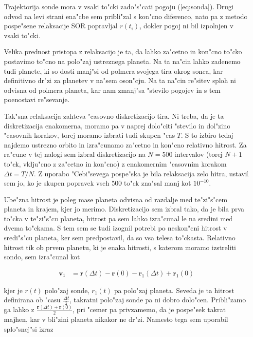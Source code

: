 \documentclass[a4paper,10pt]{article}
\renewcommand{\vec}{\mathbf}
\begin{document}
Trajektorija sonde mora v vsaki to"cki zado"s"cati pogoju (\ref{eq:sonda}). Drugi odvod na levi strani ena"cbe sem pribli"zal s kon"cno diferenco, nato pa z metodo pospe"sene relaksacije SOR popravljal $r(t_i)$, dokler pogoj ni bil izpolnjen v vsaki to"cki.

Velika prednost pristopa z relaksacijo je ta, da lahko za"cetno in kon"cno to"cko postavimo to"cno na polo"zaj ustreznega planeta. Na ta na"cin lahko zadenemo tudi planete, ki so dosti manj"si od polmera svojega tira okrog sonca, kar definitivno dr"zi za planetev v na"sem oson"cju. Na ta na"cin re"sitev sploh ni odvisna od polmera planeta, kar nam zmanj"sa "stevilo pogojev in s tem poenostavi re"sevanje. 

Tak"sna relaksacija zahteva "casovno diskretizacijo tira. Ni treba, da je ta diskretizacija enakomerna, moramo pa v naprej dolo"citi "stevilo in dol"zino "casovnih korakov, torej moramo izbrati tudi skupen "cas $T$. S to izbiro tedaj najdemo ustrezno orbito in izra"cunamo za"cetno in kon"cno relativno hitrost. Za ra"cune v tej nalogi sem izbral diskretizacijo na $N=500$ intervalov (torej $N+1$ to"ck, vklju"cno z za"cetno in kon"cno) z enakomernim "casovnim korakom $\Delta t = T/N$. Z uporabo "Cebi"sevega pospe"ska je bila relaksacija zelo hitra, ustavil sem jo, ko je skupen popravek vseh 500 to"ck zna"sal manj kot $10^{-10}$. 

Ube"zna hitrost je poleg mase planeta odvisna od razdalje med te"zi"s"cem planeta in krajem, kjer jo merimo. Diskretizacijo sem izbral tako, da je bila prva to"cka v te"zi"s"cu planeta, hitrost pa sem lahko izra"cunal le na sredini med dvema to"ckama. S tem sem se tudi izognil potrebi po neskon"cni hitrost v sredi"s"cu planeta, ker sem predpostavil, da so vsa telesa to"ckasta. Relativno hitrost tik ob prvem planetu, ki je enaka hitrosti, s katerom moramo izstreliti sondo, sem izra"cunal kot

\begin{align}
 \vec v_1 &= \vec r(\Delta t) - \vec r(0) - \vec r_1(\Delta t) + \vec r_1(0)
\end{align}

kjer je $r(t)$ polo"zaj sonde, $r_1(t)$ pa polo"zaj planeta. Seveda je ta hitrost definirana ob "casu $\frac{\Delta t}{2}$, takratni polo"zaj sonde pa ni dobro dolo"cen. Pribli"zamo ga lahko z $\frac{\vec r(\Delta t) + \vec r(0)}{2}$, pri "cemer pa privzamemo, da je pospe"sek takrat majhen, kar v bli"zini planeta nikakor ne dr"zi. Namesto tega sem uporabil splo"snej"si izraz 
\end{document}
